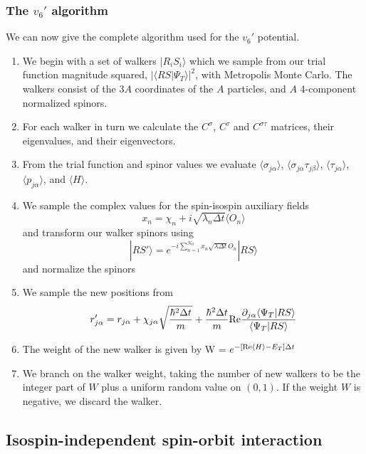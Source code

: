 \subsubsection{The $v_6'$ algorithm}
We can now give the complete algorithm used for the $v_6'$ potential.
\begin{enumerate}
\item
We begin with a set of walkers $|R_iS_i\rangle$ which we sample from
our trial function magnitude
squared, $|\langle R S|\Psi_T\rangle|^2$, with Metropolis
Monte Carlo. The walkers consist of the $3A$ coordinates of the
$A$ particles, and $A$ 4-component normalized spinors.
\item
For each walker in turn we calculate the $C^\sigma$, $C^\tau$ and
$C^{\sigma\tau}$ matrices, their eigenvalues, and their eigenvectors.
\item
From the trial function and spinor values
we evaluate $\langle \sigma_{j\alpha}\rangle$,
$\langle \sigma_{j\alpha}\tau_{j\beta}\rangle$, $\langle \tau_{j\alpha}\rangle$,
$\langle p_{j\alpha}\rangle$, and $\langle H\rangle$.
\item
We sample the complex values for the spin-isospin auxiliary fields
\begin{equation}
x_n  = \chi_n + i\sqrt{\lambda_n \Delta t}\langle O_n\rangle
\end{equation}
and transform our walker spinors using
\begin{equation}
|RS'\rangle =
e^{-i\sum_{n=1}^{N_O} x_n\sqrt{\lambda \Delta t} O_n} |RS\rangle
\end{equation}
and normalize the spinors
\item
We sample the new positions from
\begin{equation}
r_{j\alpha}' = 
r_{j\alpha}+ \chi_{j\alpha} \sqrt{\frac{\hbar^2 \Delta t}{m}}
+
\frac{\hbar^2 \Delta t}{m}
{\rm Re} \frac{\partial_{j\alpha} \langle \Psi_T |RS\rangle}
{\langle \Psi_T |RS\rangle}
\end{equation}
\item
The weight of the new walker is given by
W = $e^{- [{\rm Re} \langle H \rangle - E_T]\Delta t}$
\item
We branch on the walker weight, taking the number of new walkers
to be the integer part of $W$ plus a uniform random value on $(0,1)$.
If the weight $W$ is negative, we discard the walker.
\end{enumerate}

\subsection{Isospin-independent spin-orbit interaction}

